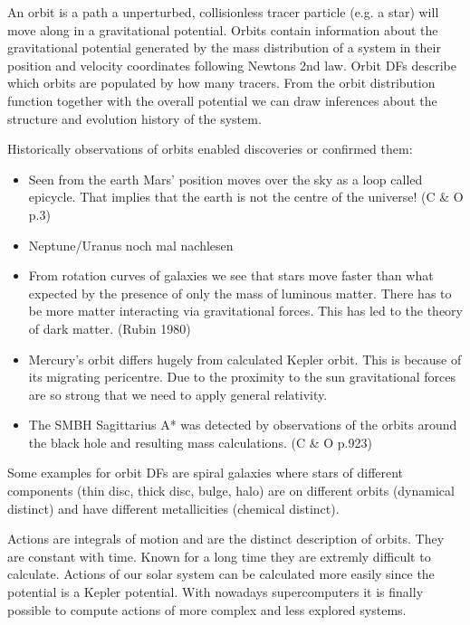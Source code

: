\par An orbit is a path a unperturbed, collisionless tracer particle (e.g. a star) will move along in a gravitational potential. Orbits contain information about the gravitational potential generated by the mass distribution of a system in their position and velocity coordinates following Newtons 2nd law. Orbit \acp{DF} describe which orbits are populated by how many tracers. From the orbit distribution function together with the overall potential we can draw inferences about the structure and evolution history of the system. 
\par Historically observations of orbits enabled discoveries or confirmed them: 
\begin{itemize}
\item Seen from the earth Mars' position moves over the sky as a loop called epicycle. That implies that the earth is not the centre of the universe! (C \& O p.3)
\item Neptune/Uranus \color{red} noch mal nachlesen \color{black}
\item From rotation curves of galaxies we see that stars move faster than what expected by the presence of only the mass of luminous matter. There has to be more matter interacting via gravitational forces. This has led to the theory of dark matter. (Rubin 1980)
\item Mercury's orbit differs hugely from calculated Kepler orbit. This is because of its migrating pericentre. Due to the proximity to the sun gravitational forces are so strong that we need to apply general relativity.
\item The \ac{SMBH} Sagittarius A*  was detected by observations of the orbits around the black hole and resulting mass calculations. (C \& O p.923)
\end{itemize}
\par Some examples for orbit \acp{DF} are spiral galaxies where stars of different components (thin disc, thick disc, bulge, halo) are on different orbits (dynamical distinct) and have different metallicities (chemical distinct).
\\\par Actions are integrals of motion and are the distinct description of orbits. They are constant with time. Known for a long time they are extremly difficult to calculate. Actions of our solar system can be calculated more easily since the potential is a Kepler potential. With nowadays supercomputers it is finally possible to compute actions of more complex and less explored systems.
